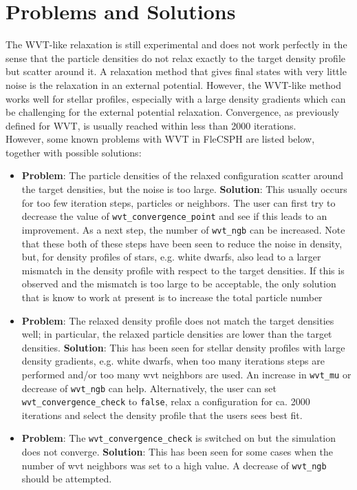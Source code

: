 \documentclass{article}
\begin{document}
\section{Problems and Solutions}
The WVT-like relaxation is still experimental and  does not work perfectly in the sense that the particle densities do not relax exactly to the target density profile but scatter around it.
A relaxation method that gives final states with very little noise is the relaxation in an external potential. 
However, the WVT-like method works well for stellar profiles, especially with a large density gradients which can be challenging for the external potential relaxation. Convergence, as previously defined for WVT, is usually reached within less than 2000 iterations. \\
However, some known problems with WVT in FleCSPH are listed below, together with possible solutions:
\begin{itemize}
\item \textbf{Problem}: The particle densities of the relaxed configuration scatter around the target densities, but the noise is too large. \textbf{Solution}: This usually occurs for too few iteration steps, particles or neighbors. The user can first try to decrease the value of \texttt{wvt\_convergence\_point} and see if this leads to an improvement. As a next step, the number of \texttt{wvt\_ngb} can be increased. Note that these both of these steps have been seen to reduce the noise in density, but, for density profiles of stars, e.g. white dwarfs, also lead to a larger mismatch in the density profile with respect to the target densities. If this is observed and the mismatch is too large to be acceptable, the only solution that is know to work at present is to increase the total particle number
\item \textbf{Problem}: The relaxed density profile does not match the target densities well; in particular, the relaxed particle densities are lower than the target densities. \textbf{Solution}: This has been seen for stellar density profiles with large density gradients, e.g. white dwarfs, when too many iterations steps are performed and/or too many wvt neighbors are used. An increase in \texttt{wvt\_mu} or decrease of \texttt{wvt\_ngb} can help. Alternatively, the user can set \texttt{wvt\_convergence\_check} to \texttt{false}, relax a configuration for ca. 2000 iterations and select the density profile that the users sees best fit. 
\item \textbf{Problem}: The \texttt{wvt\_convergence\_check} is switched on but the simulation does not converge. \textbf{Solution}: This has been seen for some cases when the number of wvt neighbors was set to a high value. A decrease of \texttt{wvt\_ngb} should be attempted.  
\end{itemize}




\end{document}
